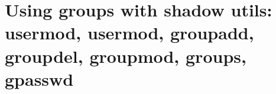 
\chapter{Using groups with shadow utils: usermod, usermod, groupadd, groupdel, groupmod, groups, gpasswd}

